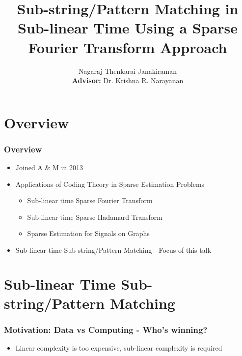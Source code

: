 \documentclass[10pt,xcolor=table]{beamer}
\begin{document}
\title{Sub-string/Pattern Matching in Sub-linear Time Using a Sparse Fourier Transform Approach}
\author{ Nagaraj Thenkarai Janakiraman \\
{\bf Advisor:} Dr. Krishna R. Narayanan \\
}
\date{}
\frame{\titlepage}


\section*{Overview}

\begin{frame}\frametitle{Overview}
\begin{itemize}\itemsep15pt
	\item Joined A \& M in 2013
	\item Applications of Coding Theory in Sparse Estimation Problems
		\begin{itemize}\itemsep10pt
			\item Sub-linear time Sparse Fourier Transform
			\item Sub-linear time Sparse Hadamard Transform
			\item Sparse Estimation for Signals on Graphs
		\end{itemize}
	\item Sub-linear time Sub-string/Pattern Matching - Focus of this talk
	
\end{itemize}
\end{frame}


\section{Sub-linear Time Sub-string/Pattern Matching}

\begin{frame}\frametitle{Motivation: Data vs Computing - Who's winning?}

\begin{itemize}
	\item Linear complexity is too expensive, sub-linear complexity is required
\end{itemize}

\end{frame}
\end{document}
